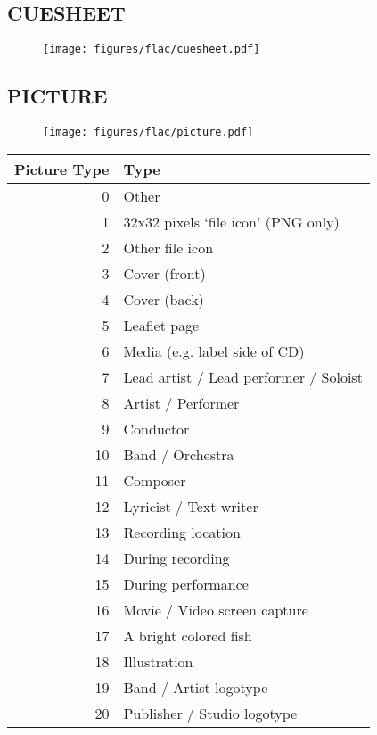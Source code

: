 \pagebreak

\subsection{CUESHEET}
\begin{figure}[h]
\texttt{[image: figures/flac/cuesheet.pdf]}
\end{figure}

\subsection{PICTURE}
\begin{figure}[h]
\texttt{[image: figures/flac/picture.pdf]}
\end{figure}
\begin{tabular}{|r|l|}
\hline
Picture Type & Type \\
\hline
0 & Other \\
1 & 32x32 pixels `file icon' (PNG only) \\
2 & Other file icon \\
3 & Cover (front) \\
4 & Cover (back) \\
5 & Leaflet page \\
6 & Media (e.g. label side of CD) \\
7 & Lead artist / Lead performer / Soloist \\
8 & Artist / Performer \\
9 & Conductor \\
10 & Band / Orchestra \\
11 & Composer \\
12 & Lyricist / Text writer \\
13 & Recording location \\
14 & During recording \\
15 & During performance \\
16 & Movie / Video screen capture \\
17 & A bright colored fish \\
18 & Illustration \\
19 & Band / Artist logotype \\
20 & Publisher / Studio logotype \\
\hline
\end{tabular}

